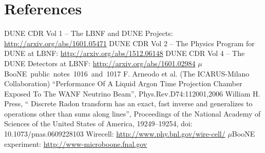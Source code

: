 \documentclass[a4paper]{jpconf}
\begin{document}
\section*{References}
\begin{thebibliography}{9}
 DUNE CDR Vol 1 -- The LBNF and DUNE Projects: \url{http://arxiv.org/abs/1601.05471}
 DUNE CDR Vol 2 -- The Physics Program for DUNE at LBNF: \url{http://arxiv.org/abs/1512.06148}
  DUNE CDR Vol 4 -- The DUNE Detectors at LBNF: \url{http://arxiv.org/abs/1601.02984}
 \mbox{$\mu$BooNE public notes 1016 and 1017}
  F. Arneodo et al. (The ICARUS-Milano Collaboration) ``Performance Of A Liquid Argon Time Projection Chamber Exposed To The WANF Neutrino Beam'', Phys.Rev.D74:112001,2006
  William H. Press, `` Discrete Radon transform has an exact, fast inverse and generalizes to operations other than sums along lines'', Proceedings of the National Academy of Sciences of the United States of America, 19249–19254, doi: 10.1073/pnas.0609228103
 Wirecell: \url{http://www.phy.bnl.gov/wire-cell/}
 $\mu$BooNE experiment: \url{http://www-microboone.fnal.gov}

\end{thebibliography}
\end{document}
